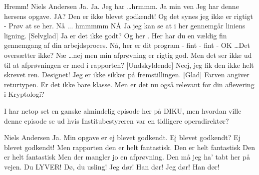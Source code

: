 \documentclass[a4paper,11pt]{article}
\begin{document}
\begin{sketch}

 Hremm! Niels Andersen
 Ja. 
 Ja. Jeg har \ldots hrmmm.
 Ja min ven 
 Jeg har denne hersens opgave.
 JA?
 Den er ikke blevet godkendt! Og det synes jeg ikke er rigtigt - Prøv at se her. 
 Nå ... hmmmmm  NÅ  Ja jeg kan se at i her gennemgår liniens ligning.
[Selvglad] Ja er det ikke godt?
 Og her . Her har du en vældig fin gennemgang af din arbejdsproces. 
 Nå, her er dit program - fint  - fint  - OK \ldots Det oversætter ikke?
 Næ \ldots nej men min afprøvning er rigtig god.
Men det ser ikke ud til at afprøvningen er med i rapporten?
[Undskyldende] Neej, jeg fik den ikke helt skrevet ren.
 Designet!  Jeg er ikke sikker på fremstillingen. 
[Glad] Farven angiver returtypen. Er det ikke bare klasse.
 Men er det nu også relevant for din aflevering i Kryptologi?

 I har netop set en ganske almindelig episode her på DIKU, men hvordan ville denne episode se ud hvis 
Institubestyreren var en tidligere operadirektør?  

 Niels Andersen
 Ja. 
 Min opgave er ej blevet godkendt.
 Ej blevet godkendt?
  Ej blevet godkendt!
  Men rapporten den er helt fantastisk.
 Den er helt fantastisk
 Den er helt fantastisk
  Men der mangler jo en afprøvning.
  Den må jeg ha'
tabt her på vejen. 
  Du LYVER! Dø, du usling!
 Jeg dør!
 Han dør!
 Jeg dør!
 Han dør!


\end{sketch}
\end{document}

